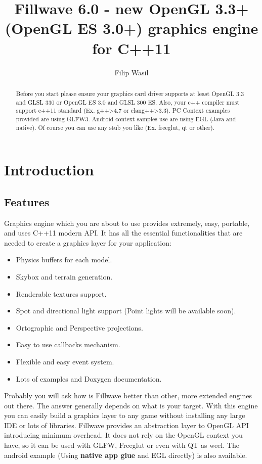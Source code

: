 \documentclass{article}
\begin{document}
\title{\textbf{Fillwave 6.0}
 - new OpenGL 3.3+ (OpenGL ES 3.0+) graphics engine for C++11 }
\author{Filip Wasil}

\maketitle

\begin{abstract}
Before you start please ensure your graphics card driver supports at least OpenGL 3.3 and GLSL 330 or OpenGL ES 3.0 and GLSL 300 ES. Also, your c++ compiler must support c++11 standard (Ex. g++\textgreater4.7 or clang++\textgreater3.3). PC Context examples provided are using GLFW3. Android context samples use are using EGL (Java and native). Of course you can use any stub you like (Ex. freeglut, qt or other).
\end{abstract}

\pagebreak
\tableofcontents

\newpage

\section{Introduction}
\subsection{Features}\label{sec:Features}
\indent \indent Graphics engine which you are about to use provides extremely, easy, portable, and uses C++11 modern API. It has all the essential functionalities that are needed to create a graphics layer for your application:

\begin{itemize}
  \item Physics buffers for each model.
  \item Skybox and terrain generation.
  \item Renderable textures support.
  \item Spot and directional light support (Point lights will be available soon).
  \item Ortographic and Perspective projections.
  \item Easy to use callbacks mechanism.
  \item Flexible and easy event system.
  \item Lots of examples and Doxygen documentation.
\end{itemize}

Probably you will ask how is Fillwave better than other, more extended engines out there. The answer generally depends on what is your target. With this engine you can easily build a graphics layer to any game without installing any large IDE or lots of libraries. Fillwave provides an abstraction layer to OpenGL API introducing minimum overhead. It does not rely on the OpenGL context you have, so it can be used with GLFW, Freeglut or even with QT as weel. The android example (Using \textbf{native app glue} and EGL directly) is also available.\newpage
\end{document}
